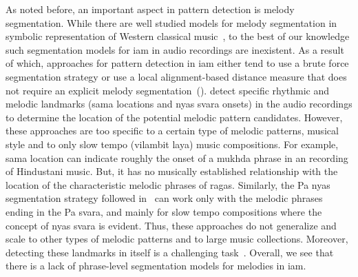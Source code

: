 As noted before, an important aspect in pattern detection is melody segmentation. While there are well studied models for melody segmentation in symbolic representation of Western classical music~\citep{Cambouropoulos2006,rodriguez2014comparing}, to the best of our knowledge such segmentation models for \gls{iam} in audio recordings are inexistent. As a result of which, approaches for pattern detection in \gls{iam} either tend to use a brute force segmentation strategy or use a local alignment-based distance measure that does not require an explicit melody segmentation~(). \cite{Ross2012,Ross2012b} detect specific rhythmic and melodic landmarks (\gls{sama} locations and \gls{nyas} \gls{svara} onsets) in the audio recordings to determine the location of the potential melodic pattern candidates. However, these approaches are too specific to a certain type of melodic patterns, musical style and to only slow tempo (vilambit laya) music compositions. For example, \gls{sama} location can indicate roughly the onset of a \gls{mukhda} phrase in an recording of Hindustani music. But, it has no musically established relationship with the location of the characteristic melodic phrases of \glspl{raga}. Similarly, the Pa \gls{nyas} segmentation strategy followed in~\cite{Ross2012} can work only with the melodic phrases ending in the Pa \gls{svara}, and mainly for slow tempo compositions where the concept of \gls{nyas} \gls{svara} is evident. Thus, these approaches do not generalize and scale to other types of melodic patterns and to large music collections. Moreover, detecting these landmarks in itself is a challenging task~\citep{srinivasamurthy2014supervised,gulati2014Landmark}. Overall, we see that there is a lack of phrase-level segmentation models for melodies in \gls{iam}.

